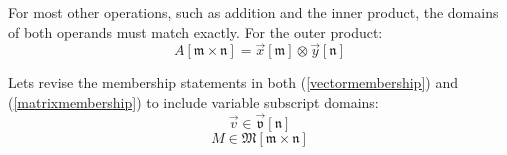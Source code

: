 \documentclass{article}
\newcommand{\vectorclass}{\vec{\mathfrak{v}}}
\newcommand{\matrixclass}{\mathfrak{M}}
\renewcommand{\outer}{\otimes}
\newcommand{\domain}[1]{\mathfrak{#1}}
\begin{document}
For most other operations, such as addition and the inner product, the
domains of both operands must match exactly.
For the outer product:
\begin{equation}
	A [\domain{m} \times \domain{n}] = \vec x [\domain{m}] \outer \vec y [\domain{n}]
\end{equation}

Lets revise the membership statements in both (\ref{vectormembership}) and
(\ref{matrixmembership}) to include variable subscript domains:
\begin{equation}
	\vec v \in \vectorclass [\domain{n}]
\end{equation}
\begin{equation}
	M \in \matrixclass [\domain{m} \times \domain{n}]
\end{equation}



\end{document}
